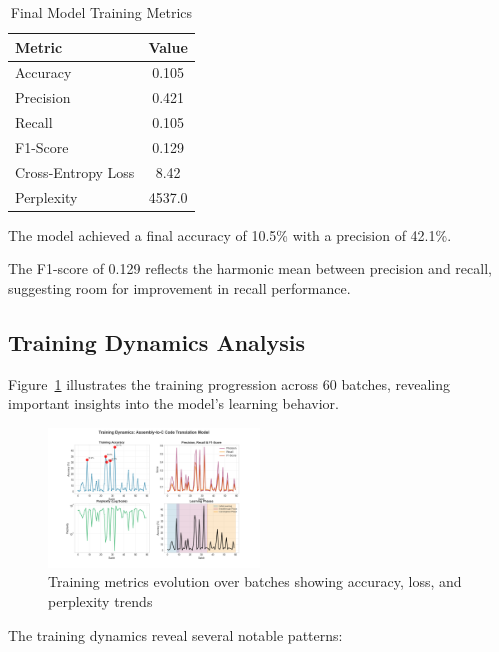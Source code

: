 \documentclass[../main.tex]{subfiles}
\begin{document}
\begin{table}[htbp]
\centering
\caption{Final Model Training Metrics}
\label{tab:training_metrics}
\begin{tabular}{lc}
\toprule
\textbf{Metric} & \textbf{Value} \\
\midrule
Accuracy & 0.105 \\
Precision & 0.421 \\
Recall & 0.105 \\
F1-Score & 0.129 \\
Cross-Entropy Loss & 8.42 \\
Perplexity & 4537.0 \\
\bottomrule
\end{tabular}
\end{table}

The model achieved a final accuracy of 10.5\% with a precision of 42.1\%. 

The F1-score of 0.129 reflects the harmonic mean between precision and recall, suggesting room for improvement in recall performance.

\subsection{Training Dynamics Analysis}

Figure~\ref{fig:images/training_curves.png} illustrates the training progression across 60 batches, revealing important insights into the model's learning behavior.

\begin{figure}[htbp]
\centering
\includegraphics[width=0.5\textwidth]{images/training_curves.png}
\caption{Training metrics evolution over batches showing accuracy, loss, and perplexity trends}
\label{fig:images/training_curves.png}
\end{figure}

The training dynamics reveal several notable patterns:
\end{document}
